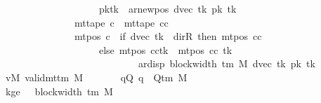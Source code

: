 \begin{isabellebody}
\ \ \ \ \ \ \ \ \ \ \ \ \ \ \ \ \ \ \ \ \ \ \ \ \ \ pk{\isacharprime}{\kern0pt}{\isacharparenleft}{\kern0pt}tk{\isacharprime}{\kern0pt}\ {\isacharcolon}{\kern0pt}{\isacharequal}{\kern0pt}\ ar{\isacharunderscore}{\kern0pt}newpos\ {\isacharparenleft}{\kern0pt}dvec\ tk{\isacharprime}{\kern0pt}{\isacharparenright}{\kern0pt}\ {\isacharparenleft}{\kern0pt}pk{\isacharprime}{\kern0pt}\ tk{\isacharprime}{\kern0pt}{\isacharparenright}{\kern0pt}{\isacharparenright}{\kern0pt}{\isacharparenright}{\kern0pt}\isanewline
\ \ \ \ \ \ \ \ \ \ \ \ \ \ \ \ \ \ \ \ {\isasymand}\ mt{\isacharunderscore}{\kern0pt}tape\ c{\isacharprime}{\kern0pt}\ {\isacharequal}{\kern0pt}\ mt{\isacharunderscore}{\kern0pt}tape\ cc\isanewline
\ \ \ \ \ \ \ \ \ \ \ \ \ \ \ \ \ \ \ \ {\isasymand}\ mt{\isacharunderscore}{\kern0pt}pos\ c{\isacharprime}{\kern0pt}\ {\isacharequal}{\kern0pt}\ {\isacharparenleft}{\kern0pt}if\ dvec\ tk{\isacharprime}{\kern0pt}\ {\isacharequal}{\kern0pt}\ dir{\isachardot}{\kern0pt}R\ then\ mt{\isacharunderscore}{\kern0pt}pos\ cc\isanewline
\ \ \ \ \ \ \ \ \ \ \ \ \ \ \ \ \ \ \ \ \ \ \ \ \ \ else\ {\isacharparenleft}{\kern0pt}mt{\isacharunderscore}{\kern0pt}pos\ cc{\isacharparenright}{\kern0pt}{\isacharparenleft}{\kern0pt}tk{\isacharprime}{\kern0pt}\ {\isacharcolon}{\kern0pt}{\isacharequal}{\kern0pt}\ mt{\isacharunderscore}{\kern0pt}pos\ cc\ tk{\isacharprime}{\kern0pt}\isanewline
\ \ \ \ \ \ \ \ \ \ \ \ \ \ \ \ \ \ \ \ \ \ \ \ \ \ \ \ \ \ \ \ \ {\isacharminus}{\kern0pt}\ ar{\isacharunderscore}{\kern0pt}disp\ {\isacharparenleft}{\kern0pt}block{\isacharunderscore}{\kern0pt}width\ {\isacharparenleft}{\kern0pt}{\isasymGamma}{\isacharunderscore}{\kern0pt}tm\ M{\isacharparenright}{\kern0pt}{\isacharparenright}{\kern0pt}\ {\isacharparenleft}{\kern0pt}dvec\ tk{\isacharprime}{\kern0pt}{\isacharparenright}{\kern0pt}\ {\isacharparenleft}{\kern0pt}pk{\isacharprime}{\kern0pt}\ tk{\isacharprime}{\kern0pt}{\isacharparenright}{\kern0pt}{\isacharparenright}{\kern0pt}{\isacharparenright}{\kern0pt}{\isachardoublequoteclose}\isanewline
\ \ \ \ \ \ \ vM{\isacharcolon}{\kern0pt}\ {\isachardoublequoteopen}valid{\isacharunderscore}{\kern0pt}mttm\ M{\isachardoublequoteclose}\isanewline
\ \ \ \ \ \ \ qQ{\isacharcolon}{\kern0pt}\ {\isachardoublequoteopen}q\ {\isasymin}\ Q{\isacharunderscore}{\kern0pt}tm\ M{\isachardoublequoteclose}\isanewline
\ \ \ \ \ \ \ kge{}{\isacharcolon}{\kern0pt}\ {\isachardoublequoteopen}{}\ {\isasymle}\ block{\isacharunderscore}{\kern0pt}width\ {\isacharparenleft}{\kern0pt}{\isasymGamma}{\isacharunderscore}{\kern0pt}tm\ M{\isacharparenright}{\kern0pt}{\isachardoublequoteclose}\isanewline

\end{isabellebody}
